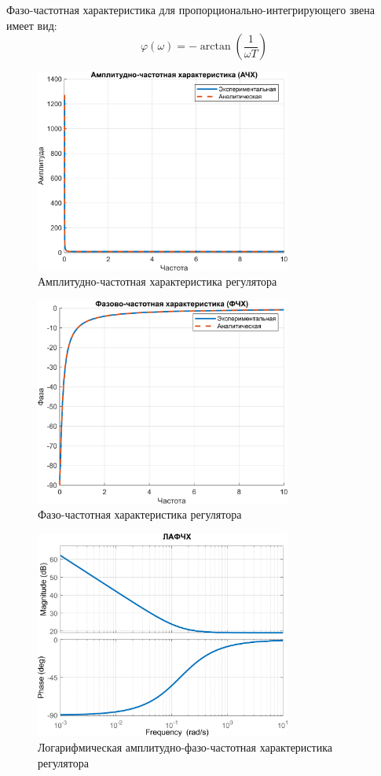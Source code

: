 Фазо-частотная характеристика для пропорционально-интегрирующего звена имеет вид:
\[
    \varphi(\omega) = -\arctan\left(\frac{1}{\omega T}\right)
\]

\begin{figure}[H]
    \centering
    \includegraphics[width=0.75\textwidth, trim={0cm 0cm 0cm 0cm}]{../images/5_3.png}
    \caption{Амплитудно-частотная характеристика регулятора}
\end{figure}

\begin{figure}[H]
    \centering
    \includegraphics[width=0.75\textwidth, trim={0cm 0cm 0cm 0cm}]{../images/5_4.png}
    \caption{Фазо-частотная характеристика регулятора}
\end{figure}

\begin{figure}[H]
    \centering
    \includegraphics[width=0.75\textwidth, trim={0cm 0cm 0cm 0cm}]{../images/5_5.png}
    \caption{Логарифмическая амплитудно-фазо-частотная характеристика регулятора}
\end{figure}
\endinput